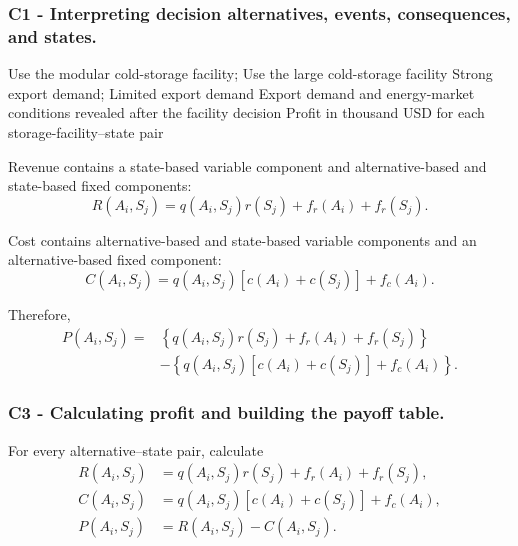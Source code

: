 \subsubsection*{C1 - Interpreting decision alternatives, events, consequences, and states.}
\label{subsec:problem18-cold-storage-export-contract-c1}

\DecisionElementsTable
{Use the modular cold-storage facility; Use the large cold-storage facility}
{Strong export demand; Limited export demand}
{Export demand and energy-market conditions revealed after the facility decision}
{Profit in thousand USD for each storage-facility--state pair}

Revenue contains a state-based variable component and alternative-based and
state-based fixed components:
\[
R(A_i,S_j)
=
q(A_i,S_j)r(S_j)
+
f_r(A_i)
+
f_r(S_j).
\]

Cost contains alternative-based and state-based variable components and an
alternative-based fixed component:
\[
C(A_i,S_j)
=
q(A_i,S_j)
\left[
c(A_i)+c(S_j)
\right]
+
f_c(A_i).
\]

Therefore,
\[
\begin{aligned}
	P(A_i,S_j)
	={}&
	\left\{
	q(A_i,S_j)r(S_j)
	+
	f_r(A_i)
	+
	f_r(S_j)
	\right\}
	\\
	&-
	\left\{
	q(A_i,S_j)
	\left[
	c(A_i)+c(S_j)
	\right]
	+
	f_c(A_i)
	\right\}.
\end{aligned}
\]


\subsubsection*{C3 - Calculating profit and building the payoff table.}
\label{subsec:problem18-cold-storage-export-contract-c3}

For every alternative--state pair, calculate
\[
\begin{aligned}
	R(A_i,S_j)
	&=
	q(A_i,S_j)r(S_j)
	+
	f_r(A_i)
	+
	f_r(S_j),
	\\
	C(A_i,S_j)
	&=
	q(A_i,S_j)
	\left[
	c(A_i)+c(S_j)
	\right]
	+
	f_c(A_i),
	\\
	P(A_i,S_j)
	&=
	R(A_i,S_j)-C(A_i,S_j).
\end{aligned}
\]

